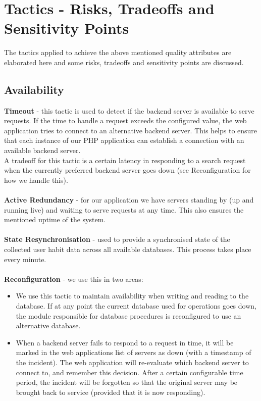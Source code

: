 \newpage

\hypertarget{tactics}{
\section{Tactics - Risks, Tradeoffs and Sensitivity Points}}
The tactics applied to achieve the above mentioned quality attributes are
elaborated here and some risks, tradeoffs and sensitivity points are discussed.

\subsection{Availability}
\textbf{Timeout} - this tactic is used to detect if the backend server is
available to serve requests. If the time to handle a request exceeds the
configured value, the web application tries to connect to an alternative backend
server. This helps to ensure that each instance of our PHP application can
establish a connection with an available backend server. \\

A tradeoff for this tactic is a certain latency in responding to a search
request when the currently preferred backend server goes down
(see Reconfiguration for how we handle this). \\ \\
\textbf{Active Redundancy} - for our application we have servers standing by
(up and running live) and waiting to serve requests at any time. This also
ensures the mentioned uptime of the system. \\ \\
\textbf{State Resynchronisation} - used to provide a synchronised state of the
collected user habit data across all available databases. This process takes
place every minute. \\ \\
\textbf{Reconfiguration} - we use this in two areas:
\begin{itemize}
  \item We use this tactic to maintain availability when writing and reading to
     the database. If at any point the current database used for operations goes
     down, the module responsible for database procedures is reconfigured to use
     an alternative database.
  \item When a backend server fails to respond to a request in time, it will be
     marked in the web applications list of servers as down (with a timestamp
     of the incident). The web application will re-evaluate which backend server
     to connect to, and remember this decision. After a certain configurable
     time period, the incident will be forgotten so that the original server
     may be brought back to service (provided that it is now responding).
\end{itemize}

